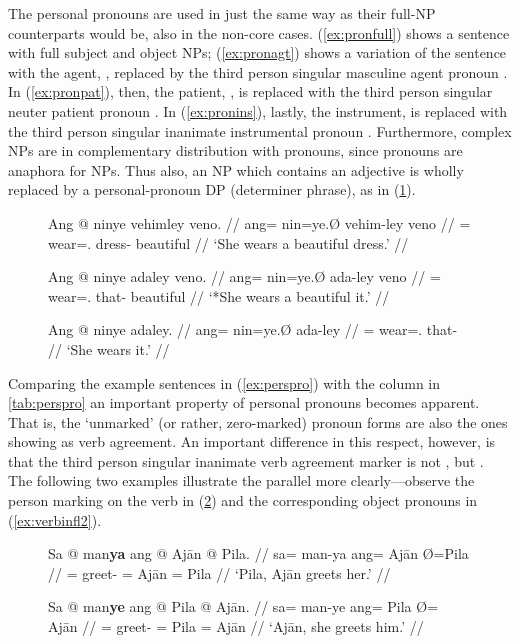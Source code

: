 The personal pronouns are used in just the same way as their full-NP
counterparts would be, also in the non-core cases. (\ref{ex:pronfull}) shows a
sentence with full subject and object NPs; (\ref{ex:pronagt}) shows a variation
of the sentence with the agent, , replaced by the third
person singular masculine agent pronoun . In
(\ref{ex:pronpat}), then, the patient, , is replaced
with the third person singular neuter patient pronoun . In
(\ref{ex:pronins}), lastly, the instrument,  is
replaced with the third person singular inanimate instrumental pronoun
. Furthermore, complex NPs are in complementary
distribution with pronouns, since pronouns are anaphora for NPs. Thus also, an
NP which contains an adjective is wholly replaced by a personal-pronoun DP 
(determiner phrase), as in (\ref{ex:procompldist}).

\begin{figure}[h]
\pex\label{ex:procompldist}
\a\begingl
	\gla Ang @ ninye vehimley veno. //
	\glb ang= nin=ye.Ø vehim-ley veno //
	\glc \AgtT{}= wear=\TsgF{}.\Top{} dress-\PargI{} beautiful //
	\glft `She wears a beautiful dress.' //
\endgl

\a\ljudge* \begingl
	\gla Ang @ ninye adaley veno. //
	\glb ang= nin=ye.Ø ada-ley veno //
	\glc \AgtT{}= wear=\TsgF{}.\Top{} that-\PargI{} beautiful //
	\glft `*She wears a beautiful it.' //
\endgl

\a\begingl
	\gla Ang @ ninye adaley. //
	\glb ang= nin=ye.Ø ada-ley //
	\glc \AgtT{}= wear=\TsgF{}.\Top{} that-\PargI{} //
	\glft `She wears it.' //
\endgl
\xe
\end{figure}

Comparing the example sentences in (\ref{ex:perspro}) with the \Top{} column
in \autoref{tab:perspro} an important property of personal pronouns becomes 
apparent. That is, the `unmarked' (or rather, zero-marked) pronoun forms are 
also the ones showing as verb agreement. An important difference in this 
respect, however, is that the third person singular inanimate verb agreement 
marker is not , but . The following two examples 
illustrate the parallel more clearly---observe the person marking on the verb 
in (\ref{ex:verbinfl1}) and the corresponding object pronouns in 
(\ref{ex:verbinfl2}).

\begin{figure}
\pex\label{ex:verbinfl1}
\a\begingl
	\gla Sa @ man\textbf{ya} ang @ Ajān {} @ Pila. //
	\glb sa= man-ya ang= ​Ajān Ø= ​Pila //
	\glc \PatT{}= greet-\TsgM{} \Aarg{}= ​Ajān \Top{}= ​Pila //
	\glft `Pila, Ajān greets her.' //
\endgl

\a\begingl
	\gla Sa @ man\textbf{ye} ang @ Pila {} @ Ajān. //
	\glb sa= man-ye ang= Pila Ø= ​Ajān //
	\glc \PatT{}= greet-\TsgF{} \Aarg{}= Pila \Top{}= ​Ajān //
	\glft `Ajān, she greets him.' //
\endgl

\xe
\end{figure}

